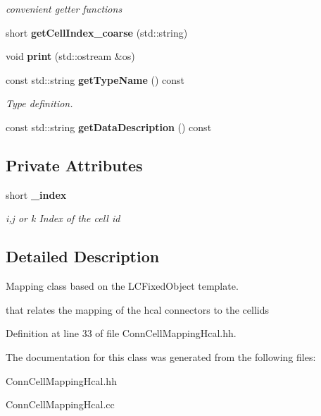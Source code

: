 \begin{DoxyCompactItemize}
\begin{DoxyCompactList}\small\item\em convenient getter functions \end{DoxyCompactList}\item 
short {\bfseries get\-Cell\-Index\-\_\-coarse} (std\-::string)\label{classCALICE_1_1ConnCellMappingHcal_aeb22fd5dbacc508100ff4b34d8d6d5e4}

\item 
void {\bfseries print} (std\-::ostream \&os)\label{classCALICE_1_1ConnCellMappingHcal_ad40f3d45f299b067ba913d53651c9102}

\item 
const std\-::string {\bf get\-Type\-Name} () const \label{classCALICE_1_1ConnCellMappingHcal_a824a0896a35021b8ea42da52c9bfae38}

\begin{DoxyCompactList}\small\item\em Type definition. \end{DoxyCompactList}\item 
const std\-::string {\bfseries get\-Data\-Description} () const \label{classCALICE_1_1ConnCellMappingHcal_a826f2d60b31e3329b5a68dccd014244f}

\end{DoxyCompactItemize}
\subsection*{Private Attributes}
\begin{DoxyCompactItemize}
\item 
short {\bf \-\_\-index}\label{classCALICE_1_1ConnCellMappingHcal_a63ebe04fafeb25e26b642d38b768cd71}

\begin{DoxyCompactList}\small\item\em i,j or k Index of the cell id \end{DoxyCompactList}\end{DoxyCompactItemize}


\subsection{Detailed Description}
Mapping class based on the L\-C\-Fixed\-Object template. 

that relates the mapping of the hcal connectors to the cellids 

Definition at line 33 of file Conn\-Cell\-Mapping\-Hcal.\-hh.



The documentation for this class was generated from the following files\-:\begin{DoxyCompactItemize}
\item 
Conn\-Cell\-Mapping\-Hcal.\-hh\item 
Conn\-Cell\-Mapping\-Hcal.\-cc\end{DoxyCompactItemize}
